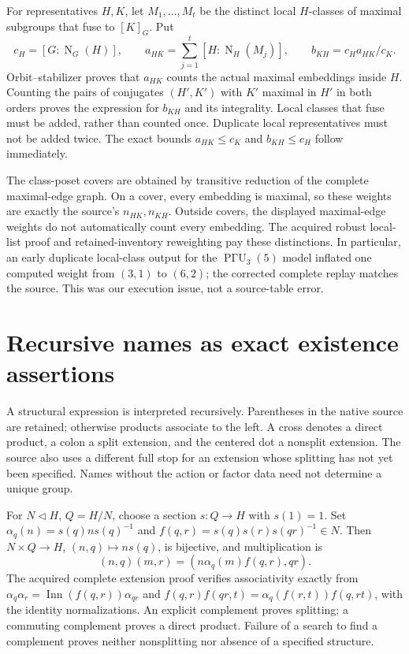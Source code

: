 \documentclass[11pt]{article}
\newcommand{\N}{\operatorname{N}}\newcommand{\C}{\mathrm C}
\begin{document}
For representatives $H,K$, let $M_1,\ldots,M_t$ be the distinct local
$H$-classes of maximal subgroups that fuse to $[K]_G$. Put
\[
 c_H=[G:\N_G(H)],\qquad
 a_{HK}=\sum_{j=1}^t[H:\N_H(M_j)],\qquad
 b_{KH}=c_Ha_{HK}/c_K.
\]
Orbit--stabilizer proves that $a_{HK}$ counts the actual maximal embeddings
inside $H$. Counting the pairs of conjugates $(H',K')$ with $K'$ maximal
in $H'$ in both orders proves the expression for $b_{KH}$ and its integrality.
Local classes that fuse must be added, rather than counted once.
Duplicate local representatives must not be added twice. The exact bounds
$a_{HK}\leq c_K$ and $b_{KH}\leq c_H$ follow immediately.

The class-poset covers are obtained by transitive reduction of the complete
maximal-edge graph. On a cover, every embedding is maximal, so these weights
are exactly the source's $n_{HK},n_{KH}$. Outside covers, the displayed
maximal-edge weights do not automatically count every embedding.
The acquired robust local-list proof and retained-inventory reweighting
pay these distinctions. In particular, an early duplicate local-class
output for the $\operatorname{P\Gamma U}_3(5)$ model inflated one computed
weight from $(3,1)$ to $(6,2)$; the corrected complete replay matches the
source. This was our execution issue, not a source-table error.

\section{Recursive names as exact existence assertions}
A structural expression is interpreted recursively. Parentheses in the
native source are retained; otherwise products associate to the left.
A cross denotes a direct product, a colon a split extension, and the
centered dot a nonsplit extension. The source also uses a different full
stop for an extension whose splitting has not yet been specified.
Names without the action or factor data need not determine a unique group.

For $N\lhd H$, $Q=H/N$, choose a section $s:Q\to H$ with $s(1)=1$.
Set $\alpha_q(n)=s(q)ns(q)^{-1}$ and
$f(q,r)=s(q)s(r)s(qr)^{-1}\in N$. Then $N\times Q\to H$,
$(n,q)\mapsto ns(q)$, is bijective, and multiplication is
\[
 (n,q)(m,r)=(n\alpha_q(m)f(q,r),qr).
\]
The acquired complete extension proof verifies associativity exactly from
$\alpha_q\alpha_r=\operatorname{Inn}(f(q,r))\alpha_{qr}$ and
$f(q,r)f(qr,t)=\alpha_q(f(r,t))f(q,rt)$, with the identity normalizations.
An explicit complement proves splitting; a commuting complement proves a
direct product. Failure of a search to find a complement proves neither
nonsplitting nor absence of a specified structure.
\end{document}
